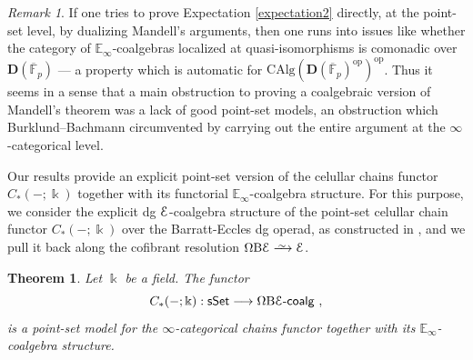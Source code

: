 \documentclass{proc-l}
\renewcommand{\mathcal}{\EuScript}
\newtheorem{theoremintro}{Theorem}
\theoremstyle{plain}
\theoremstyle{definition}
\theoremstyle{remark}
\newtheorem{remark}[{theorem}]{Remark}
\newcommand{\qi}{\xrightarrow{ \,\smash{\raisebox{-0.65ex}{\ensuremath{\scriptstyle\sim}}}\,}}
\newcommand{\kk}{\Bbbk}
\begin{document}
\begin{remark}%
\label{Remark:1.14}If one tries to prove Expectation \ref{expectation2} directly, at the point-set level, by dualizing Mandell's arguments, then one runs into issues like whether the category of $\mathbb E_\infty$-coalgebras localized at quasi-isomorphisms is comonadic over $\mathbf D(\overline{\mathbb{F}}_p)$ --- a property which is automatic for $\mathrm{CAlg}(\mathbf D(\overline{\mathbb{F}}_p)^{\mathrm{op}})^{\mathrm{op}}$. Thus it seems in a sense that a main obstruction to proving a coalgebraic version of Mandell's theorem was a lack of good point-set models, an obstruction which Burklund--Bachmann circumvented by carrying out the entire argument at the $\infty$-categorical level.
\end{remark}

Our results provide an explicit point-set version of the celullar chains functor $C_*(-;\kk)$ together with its functorial $\mathbb{E}_\infty$-coalgebra structure. For this purpose, we consider the explicit dg $\mathcal{E}$-coalgebra structure of the point-set celullar chain functor $C_*(-;\kk)$ over the Barratt-Eccles dg operad, as constructed in \cite{BergerFresse}, and we pull it back along the cofibrant resolution $\Omega \mathrm{B} \mathcal{E} \qi \mathcal{E}$.

\begin{theoremintro}%
\label{Theorem:D}\label{thm: presenting chains with the coalgebra structure}
Let $\kk$ be a field. The functor
\[
C_*(-;\kk): \mathsf{sSet} \longrightarrow \Omega \mathrm{B} \mathcal{E}\text{-}\mathsf{coalg}~,
\]
is a point-set model for the $\infty$-categorical chains functor together with its $\mathbb{E}_\infty$-coalgebra structure.
\end{theoremintro}
\end{document}

